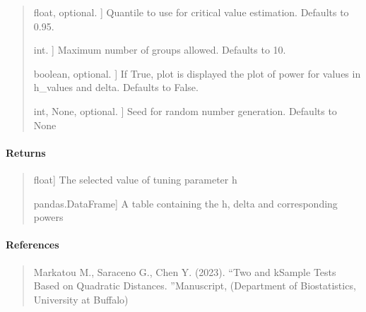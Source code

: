 \documentclass[letterpaper,10pt,english,openany,oneside]{sphinxmanual}
\begin{document}
\begin{fulllineitems}
\begin{quote}
\begin{description}
\sphinxlineitem{quantile}{[}float, optional. {]}
\sphinxAtStartPar
Quantile to use for critical value estimation. Defaults to 0.95.

\sphinxlineitem{k\_threshold}{[}int. {]}
\sphinxAtStartPar
Maximum number of groups allowed. Defaults to 10.

\sphinxlineitem{power\_plot}{[}boolean, optional. {]}
\sphinxAtStartPar
If True, plot is displayed the plot of power for 
values in h\_values and delta. Defaults to False.

\sphinxlineitem{random\_state}{[}int, None, optional. {]}
\sphinxAtStartPar
Seed for random number generation. Defaults to None

\end{description}
\end{quote}


\paragraph{Returns}
\label{\detokenize{api_reference/generated/QuadratiK.kernel_test.select_h:returns}}\begin{quote}
\begin{description}
\sphinxlineitem{h}{[}float{]}
\sphinxAtStartPar
The selected value of tuning parameter h

\sphinxlineitem{h vs Power table}{[}pandas.DataFrame{]}
\sphinxAtStartPar
A table containing the h, delta and corresponding powers

\end{description}
\end{quote}


\paragraph{References}
\label{\detokenize{api_reference/generated/QuadratiK.kernel_test.select_h:references}}\begin{quote}

\sphinxAtStartPar
Markatou M., Saraceno G., Chen Y. (2023). “Two\sphinxhyphen{} and k\sphinxhyphen{}Sample Tests Based on Quadratic Distances.
”Manuscript, (Department of Biostatistics, University at Buffalo)
\end{quote}



\end{fulllineitems}
\end{document}
